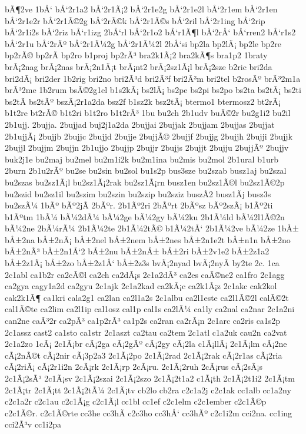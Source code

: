 {bÃ¶2ve
1bÅ‘
bÅ‘2r1a2
bÅ‘2r1Ã¡2
bÅ‘2r1e2g
bÅ‘2r1e2l
bÅ‘2r1em
bÅ‘2r1en
bÅ‘2r1e2r
bÅ‘2r1Ã©2g
bÅ‘2rÃ©k
bÅ‘2r1Ã©s
bÅ‘2ril
bÅ‘2r1ing
bÅ‘2rip
bÅ‘2r1i2s
bÅ‘2riz
bÅ‘r1izg
2bÅ‘rl
bÅ‘2r1o2
bÅ‘r1Ã¶l
bÅ‘2rÅ‘
bÅ‘rren2
bÅ‘r1s2
bÅ‘2r1u
bÅ‘2rÃº
bÅ‘2r1Ã¼2g
bÅ‘2r1Ã¼2l
2bÅ‘si
bp2la
bp2lÃ¡
bp2le
bp2re
bp2rÃ©
bp2rÃ­
bp2ro
b1proj
bp2rÃ³
bra2k1Ã¡2
bra2kÃ¶s
bra1p2
1braty
brÃ¡2nag
brÃ¡2nas
brÃ¡2n1Ã¡t
brÃ¡nt2
brÃ¡2sz1Ã¡l
brÃ¡2sze
b2ric
bri2da
bri2dÃ¡
bri2der
1b2rig
bri2no
bri2Ã³d
bri2Ã³f
bri2Ã³m
bri2tel
b2rosÃº
brÃ³2m1a
brÃ³2me
1b2rum
bsÃ©2g1el
b1s2kÃ¡
bs2lÃ¡
bs2pe
bs2pi
bs2po
bs2ta
bs2tÃ¡
bs2ti
bs2tÃ­
bs2tÃº
bszÃ¡2r1a2da
bsz2f
b1sz2k
bsz2tÃ¡
btermo1
btermosz2
bt2rÃ¡
b1t2re
bt2rÃ©
b1t2ri
b1t2ro
b1t2rÃ³
1bu
bu2ch
2b1udv
buÃ©2r
bu2g1i2
bu2il
2b1ujj.
2bujja.
2bujjad
buj2j1a2da
2bujjai
2bujjak
2bujjam
2bujjas
2bujjat
2b1ujjÃ¡
2bujjb
2bujjc
2bujjd
2bujje
2bujjÃ©
2bujjf
2bujjg
2bujjh
2bujji
2bujjk
2bujjl
2bujjm
2bujjn
2b1ujjo
2bujjp
2bujjr
2bujjs
2bujjt
2bujju
2bujjÃº
2bujjv
buk2j1e
bu2maj
bu2mel
bu2m1i2k
bu2m1ina
bu2mis
bu2mol
2b1ural
b1urb
2burn
2b1u2rÃº
bu2se
bu2sin
bu2sol
bu1s2p
bus3sze
bu2szab
busz1aj
bu2szal
bu2szas
bu2sz1Ã¡l
bu2sz1Ã¡2rak
bu2sz1Ã¡rn
busz1en
bu2sz1Ã©l
bu2sz1Ã©2p
bu2szid
bu2sz1il
bu2szim
bu2szin
bu2szip
bu2sziz
buszÃ­2
busz1Ã­j
busz3s
bu2szÃ¼
1bÃº
bÃº2jÃ­
2bÃºr.
2b1Ãº2ri
2bÃºrt
2bÃºsz
bÃº2szÃ¡
b1Ãº2ti
b1Ãºtm
1bÃ¼
bÃ¼2dÃ¼
bÃ¼2ge
bÃ¼2gy
bÃ¼2ku
2b1Ã¼ld
bÃ¼2l1Ã©2n
bÃ¼2ne
2bÃ¼rÃ¼
2b1Ã¼2te
2b1Ã¼2tÃ©
b1Ã¼2tÅ‘
2b1Ã¼2ve
bÃ¼2ze
1bÅ±
bÅ±2na
bÅ±2nÃ¡
bÅ±2nel
bÅ±2nem
bÅ±2nes
bÅ±2n1e2t
bÅ±n1n
bÅ±2no
bÅ±2nÃ³
bÅ±2n1Å‘2
bÅ±2nu
bÅ±2nÅ±
bÅ±2ri
bÅ±2v1e2
bÅ±2z1a2
bÅ±2z1Ã¡
bÅ±2zo
bÅ±2z1Å‘
bÅ±2z3s
bvÃ¡2nyad
bvÃ¡2nyÃ­
by2te
2c.
1ca
2c1abl
ca1b2r
ca2cÃ©l
ca2ch
ca2dÃ¡s
2c1a2dÃ³
ca2es
caÃ©ne2
ca1fro
2c1agg
ca2gya
cagy1a2d
ca2gyu
2c1ajk
2c1a2kad
ca2kÃ¡c
ca2k1Ã¡z
2c1akc
cak2kol
cak2k1Ã¶
ca1kri
cala2g1
ca2lan
ca2l1a2s
2c1albu
ca2l1este
ca2l1Ã©2l
calÃ©2t
cal1Ã©te
ca2lim
ca2l1ip
cal1osz
cal1p
cal1s
ca2lÃ¼
ca1ly
ca2nal
ca2nar
2c1a2ni
can2ne
caÃ³2r
ca2pÃ³
ca1p2rÃ³
ca1p2s
ca2ran
ca2rÃ¡n
2c1arc
ca2ris
ca1s2p
2c1assz
cast2
ca1sto
ca1str
2c1aszt
ca2tau
ca2tem
2c1atl
c1a2uk
cau2n
ca2vat
2c1a2zo
1cÃ¡
2c1Ã¡br
cÃ¡2ga
cÃ¡2gÃº
cÃ¡2gy
cÃ¡2la
c1Ã¡llÃ¡
2c1Ã¡lm
cÃ¡2ne
cÃ¡2nÃ©t
cÃ¡2nir
cÃ¡3p2a3
2c1Ã¡2po
2c1Ã¡2rad
2c1Ã¡2rak
cÃ¡2r1as
cÃ¡2ria
cÃ¡2riÃ¡
cÃ¡2r1i2n
2cÃ¡rk
2c1Ã¡rp
2cÃ¡ru.
2c1Ã¡2ruh
2cÃ¡rus
cÃ¡2sÃ¡s
2c1Ã¡2sÃ³
2c1Ã¡sv
2c1Ã¡2szai
2c1Ã¡2szo
2c1Ã¡2t1a2
c1Ã¡th
2c1Ã¡2t1i2
2c1Ã¡tm
2c1Ã¡tr
2c1Ã¡tt
2c1Ã¡2tÃ¼
2c1Ã¡tv
cb2lo
cb2ra
c2c1a2j
c2c1ak
cc1alb
cc1a2ny
c2c1a2r
c2c1au
c2c1Ã¡g
c2c1Ã¡l
cc1bl
cc1ef
c2c1elm
c2c1ember
c2c1Ã©p
c2c1Ã©r.
c2c1Ã©rte
cc3he
cc3hÃ­
c2c3ho
cc3hÅ‘
cc3hÃº
c2c1i2m
cci2na.
cc1ing
cci2Ã³v
cc1i2pa
}
